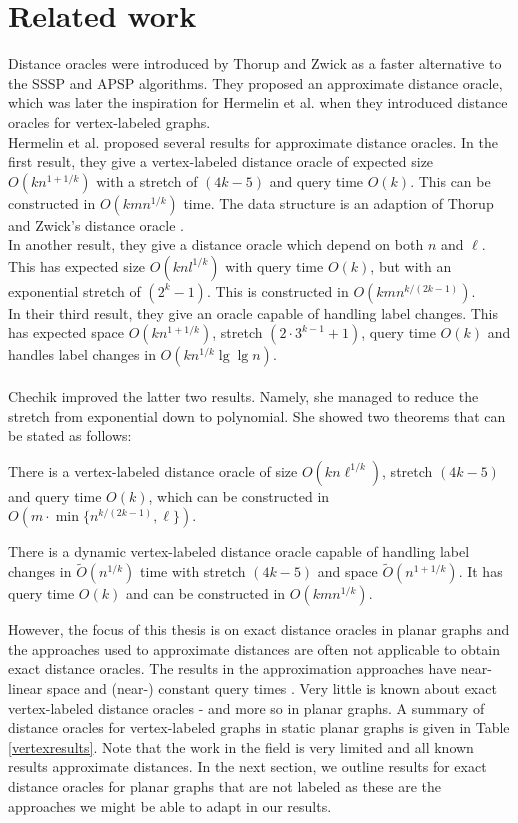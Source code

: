 \section{Related work}\label{survey}
Distance oracles were introduced by Thorup and Zwick \cite{thorup2005approximate} as a
faster alternative to the SSSP and APSP algorithms. They proposed an approximate distance
oracle, which was later the inspiration for Hermelin et al. when they introduced distance
oracles for vertex-labeled graphs. \\
Hermelin et al. \cite{hermelin2011distance} proposed several results for approximate
distance oracles. In the first result, they give a vertex-labeled distance oracle of
expected size $O(kn^{1+1/k})$ with a stretch of $(4k-5)$ and query time $O(k)$. This can
be constructed in $O(kmn^{1/k})$ time. The data structure is an adaption of Thorup and
Zwick's distance oracle \cite{thorup2005approximate}. \\
In another result, they give a distance oracle which depend on both $n$ and $\ell$. This has
expected size $O(knl^{1/k})$ with query time $O(k)$, but with an exponential stretch of
$(2^k-1)$. This is constructed in $O(kmn^{k/(2k-1)})$. \\
In their third result, they give an oracle capable of handling label changes. This has
expected space $O(kn^{1+1/k})$, stretch $(2\cdot3^{k-1}+1)$, query time $O(k)$ and
handles label changes in $O(kn^{1/k}\lg \lg n)$. \\
\\
Chechik \cite{chechik2012improved} improved the latter two results. Namely, she managed to
reduce the stretch from exponential down to polynomial. She showed two theorems that can
be stated as follows:
\begin{thm}\label{chech1}
  There is a vertex-labeled distance oracle
of size $O(kn\ell^{1/k})$, stretch $(4k-5)$  and query time $O(k)$, which can be
constructed in $O(m\cdot \min\{n^{k/(2k-1)}, \ell\})$.
\end{thm}
\begin{thm}\label{chech2}
  There is a dynamic vertex-labeled distance oracle capable of handling label changes in
$\tilde{O}(n^{1/k})$ time with stretch $(4k-5)$ and space $\tilde{O}(n^{1+1/k})$. It has
query time $O(k)$ and can be constructed in $O(kmn^{1/k})$.
\end{thm}
\noindent
However, the focus of this thesis is on exact distance oracles in planar graphs and the approaches used to
approximate distances are often not applicable to obtain exact distance oracles. The
results in the approximation approaches have near-linear space and (near-) constant query times
\cite{klein2002preprocessing} \cite{kawarabayashi2011linear} \cite{kawarabayashi2013more}
\cite{thorup2004compact} \cite{wulff2016approximate}.
Very little is known about exact vertex-labeled distance oracles - and more so in planar graphs. A summary of distance oracles for vertex-labeled graphs in static planar graphs is given in Table
\ref{vertexresults}. Note that the work in the field is very limited and all known
results approximate distances. In the next section, we outline results for exact distance
oracles for planar graphs that are not labeled as these are the approaches we might be
able to adapt in our results.

